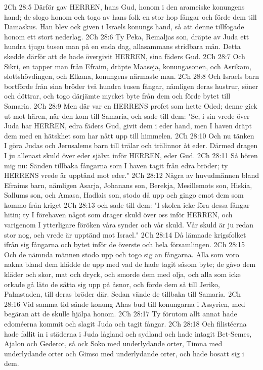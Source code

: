 2Ch 28:5  Därför gav HERREN, hans Gud, honom i den arameiske konungens hand; de slogo honom och togo av hans folk en stor hop fångar och förde dem till Damaskus. Han blev ock given i Israels konungs hand, så att denne tillfogade honom ett stort nederlag.
2Ch 28:6  Ty Peka, Remaljas son, dräpte av Juda ett hundra tjugu tusen man på en enda dag, allasammans stridbara män. Detta skedde därför att de hade övergivit HERREN, sina fäders Gud.
2Ch 28:7  Och Sikri, en tapper man från Efraim, dräpte Maaseja, konungasonen, och Asrikam, slottshövdingen, och Elkana, konungens närmaste man.
2Ch 28:8  Och Israels barn bortförde från sina bröder två hundra tusen fångar, nämligen deras hustrur, söner och döttrar, och togo därjämte mycket byte från dem och förde bytet till Samaria.
2Ch 28:9  Men där var en HERRENS profet som hette Oded; denne gick ut mot hären, när den kom till Samaria, och sade till dem: "Se, i sin vrede över Juda har HERREN, edra fäders Gud, givit dem i eder hand, men I haven dräpt dem med en hätskhet som har nått upp till himmelen.
2Ch 28:10  Och nu tänken I göra Judas och Jerusalems barn till trälar och trälinnor åt eder. Därmed dragen I ju allenast skuld över eder själva inför HERREN, eder Gud.
2Ch 28:11  Så hören mig nu: Sänden tillbaka fångarna som I haven tagit från edra bröder; ty HERRENS vrede är upptänd mot eder."
2Ch 28:12  Några av huvudmännen bland Efraims barn, nämligen Asarja, Johanans son, Berekja, Mesillemots son, Hiskia, Sallums son, och Amasa, Hadlais son, stodo då upp och gingo emot dem som kommo från kriget
2Ch 28:13  och sade till dem: "I skolen icke föra dessa fångar hitin; ty I förehaven något som drager skuld över oss inför HERREN, och varigenom I ytterligare föröken våra synder och vår skuld. Vår skuld är ju redan stor nog, och vrede är upptänd mot Israel."
2Ch 28:14  Då lämnade krigsfolket ifrån sig fångarna och bytet inför de överste och hela församlingen.
2Ch 28:15  Och de nämnda männen stodo upp och togo sig an fångarna. Alla som voro nakna bland dem klädde de upp med vad de hade tagit såsom byte; de gåvo dem kläder och skor, mat och dryck, och smorde dem med olja, och alla som icke orkade gå läto de sätta sig upp på åsnor, och förde dem så till Jeriko, Palmstaden, till deras bröder där. Sedan vände de tillbaka till Samaria.
2Ch 28:16  Vid samma tid sände konung Ahas bud till konungarna i Assyrien, med begäran att de skulle hjälpa honom.
2Ch 28:17  Ty förutom allt annat hade edoméerna kommit och slagit Juda och tagit fångar.
2Ch 28:18  Och filistéerna hade fallit in i städerna i Juda lågland och sydland och hade intagit Bet-Semes, Ajalon och Gederot, så ock Soko med underlydande orter, Timna med underlydande orter och Gimso med underlydande orter, och hade bosatt sig i dem.
